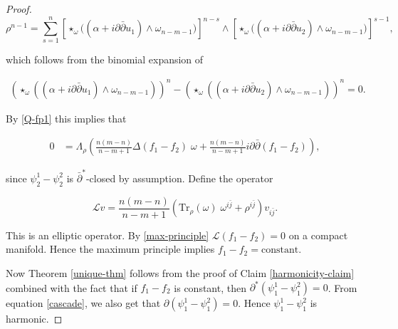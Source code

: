 \documentclass[11pt,letterpaper]{amsart}
\newcommand{\bj}{\bar{j}}
\newcommand{\spartial}{\partial^*}
\newcommand{\bpartial}{\bar{\partial}}
\newcommand{\pbp}{\partial \bar{\partial}}
\newtheorem{remark}[theorem]{Remark}
\numberwithin{equation}{section}
\begin{document}
\begin{proof}
$$\rho^{n-1} = \sum_{s=1}^{n} \left[ \star_{\omega} \Big( (\alpha + i\partial\bar{\partial}u_1) \wedge \omega_{n-m-1} \Big) \right]^{n-s} \wedge \left[ \star_{\omega} \Big( (\alpha + i\partial\bar{\partial}u_2) \wedge \omega_{n-m-1} \Big) \right]^{s-1},$$


\noindent which follows from the binomial expansion of

\begin{equation}
    \begin{aligned}
         (\star_{\omega}\left((\alpha + i \pbp u_1)\wedge \omega_{n-m-1}\right))^n -  (\star_{\omega}\left((\alpha + i \pbp u_2)\wedge \omega_{n-m-1}\right))^n = 0.
    \end{aligned}
\end{equation}




 By \eqref{Q-fp1} this implies that

\begin{equation}\label{max-principle}
    \begin{aligned}
    0 &=\Lambda_{\rho}\left(\frac{n(m-n)}{n-m+1} \Delta (f_1 -f_2) \; \omega +   \frac{n(m-n)}{n-m+1} i \partial \bar{\partial} (f_1 - f_2)\right),
    \end{aligned}
\end{equation}

\noindent since $\psi^1_{2}-\psi^2_{2}$ is $\bpartial^*$-closed by assumption. Define the operator

$$\mathcal L v = \frac{n(m-n)}{n-m+1}\left( \mbox{Tr}_{\rho}(\omega)  \; \omega^{i \bj}  +  \rho^{i \bj}\right)v_{i \bj}.$$


This is an elliptic operator. By \eqref{max-principle} $\mathcal L(f_1 - f_2) = 0$ on a compact manifold. Hence the maximum principle implies $f_1 - f_2 = \text{constant}$.


Now Theorem \ref{unique-thm} follows from the proof of Claim \eqref{harmonicity-claim} combined with the fact that if $f_1 - f_2$ is constant, then $\spartial(\psi^1_1  - \psi^2_1) = 0$. From equation \eqref{cascade}, we also get that $\partial(\psi^1_1  - \psi^2_1) = 0$. Hence $\psi^1_1  - \psi^2_1$ is harmonic. 



\end{proof}


\end{document}
